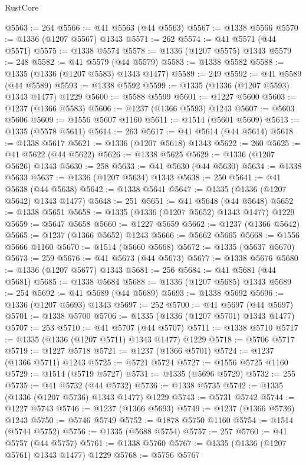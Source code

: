 \begin{lexlean}{RustCore}
\begin{coremodule}
@5563 := 264
@5566 := @41 @5563 (@44 @5563)
@5567 := @1338 @5566
@5570 := @1336 (@1207 @5567) @1343
@5571 := 262
@5574 := @41 @5571 (@44 @5571)
@5575 := @1338 @5574
@5578 := @1336 (@1207 @5575) @1343
@5579 := 248
@5582 := @41 @5579 (@44 @5579)
@5583 := @1338 @5582
@5588 := @1335 (@1336 (@1207 @5583) @1343 @1477)
@5589 := 249
@5592 := @41 @5589 (@44 @5589)
@5593 := @1338 @5592
@5599 := @1335 (@1336 (@1207 @5593) @1343 @1477) @1229
@5600 := @5588 @5599
@5601 := @1227 @5600
@5603 := @1237 (@1366 @5583)
@5606 := @1237 (@1366 @5593) @1243
@5607 := @5603 @5606
@5609 := @1556 @5607 @1160
@5611 := @1514 (@5601 @5609)
@5613 := @1335 (@5578 @5611)
@5614 := 263
@5617 := @41 @5614 (@44 @5614)
@5618 := @1338 @5617
@5621 := @1336 (@1207 @5618) @1343
@5622 := 260
@5625 := @41 @5622 (@44 @5622)
@5626 := @1338 @5625
@5629 := @1336 (@1207 @5626) @1343
@5630 := 258
@5633 := @41 @5630 (@44 @5630)
@5634 := @1338 @5633
@5637 := @1336 (@1207 @5634) @1343
@5638 := 250
@5641 := @41 @5638 (@44 @5638)
@5642 := @1338 @5641
@5647 := @1335 (@1336 (@1207 @5642) @1343 @1477)
@5648 := 251
@5651 := @41 @5648 (@44 @5648)
@5652 := @1338 @5651
@5658 := @1335 (@1336 (@1207 @5652) @1343 @1477) @1229
@5659 := @5647 @5658
@5660 := @1227 @5659
@5662 := @1237 (@1366 @5642)
@5665 := @1237 (@1366 @5652) @1243
@5666 := @5662 @5665
@5668 := @1556 @5666 @1160
@5670 := @1514 (@5660 @5668)
@5672 := @1335 (@5637 @5670)
@5673 := 259
@5676 := @41 @5673 (@44 @5673)
@5677 := @1338 @5676
@5680 := @1336 (@1207 @5677) @1343
@5681 := 256
@5684 := @41 @5681 (@44 @5681)
@5685 := @1338 @5684
@5688 := @1336 (@1207 @5685) @1343
@5689 := 254
@5692 := @41 @5689 (@44 @5689)
@5693 := @1338 @5692
@5696 := @1336 (@1207 @5693) @1343
@5697 := 252
@5700 := @41 @5697 (@44 @5697)
@5701 := @1338 @5700
@5706 := @1335 (@1336 (@1207 @5701) @1343 @1477)
@5707 := 253
@5710 := @41 @5707 (@44 @5707)
@5711 := @1338 @5710
@5717 := @1335 (@1336 (@1207 @5711) @1343 @1477) @1229
@5718 := @5706 @5717
@5719 := @1227 @5718
@5721 := @1237 (@1366 @5701)
@5724 := @1237 (@1366 @5711) @1243
@5725 := @5721 @5724
@5727 := @1556 @5725 @1160
@5729 := @1514 (@5719 @5727)
@5731 := @1335 (@5696 @5729)
@5732 := 255
@5735 := @41 @5732 (@44 @5732)
@5736 := @1338 @5735
@5742 := @1335 (@1336 (@1207 @5736) @1343 @1477) @1229
@5743 := @5731 @5742
@5744 := @1227 @5743
@5746 := @1237 (@1366 @5693)
@5749 := @1237 (@1366 @5736) @1243
@5750 := @5746 @5749
@5752 := @1878 @5750 @1160
@5754 := @1514 (@5744 @5752)
@5756 := @1335 (@5688 @5754)
@5757 := 257
@5760 := @41 @5757 (@44 @5757)
@5761 := @1338 @5760
@5767 := @1335 (@1336 (@1207 @5761) @1343 @1477) @1229
@5768 := @5756 @5767

\end{coremodule}
\end{lexlean}
